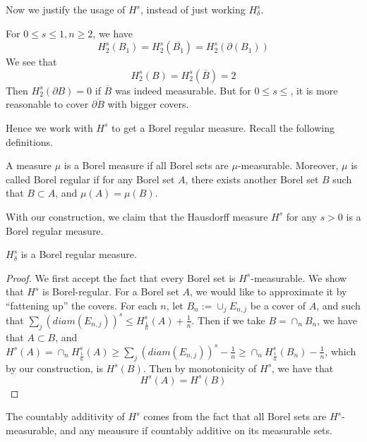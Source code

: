 Now we justify the usage of $H^s$, instead of just working $H_\delta^s$.
\begin{exercise}
    For $0\leq s\leq 1, n\geq 2$, we have
    \begin{equation*}
        H_2^s(B_1)=H_2^s(\overline{B_1})=H_2^s(\partial(B_1))
    \end{equation*}
    We see that
    \begin{equation*}
        H_2^s(B)=H_2^s(\overline{B})=2
    \end{equation*}
    Then $H_2^s(\partial B)=0$ if $\overline{B}$ was indeed measurable. But for $0\leq s\leq $, it is more reasonable to cover $\overline{\partial B}$ with bigger covers.
\end{exercise}

Hence we work with $H^s$ to get a Borel regular measure. Recall the following definitions.
\begin{definition}
    A measure $\mu$ is a Borel measure if all Borel sets are $\mu$-measurable. Moreover, $\mu$ is called Borel regular if for any Borel set $A$, there exists another Borel set $B$ such that $B\subset A$, and $\mu(A)=\mu(B)$.
\end{definition}
With our construction, we claim that the Hausdorff measure $H^s$ for any $s>0$ is a Borel regular measure.
\begin{proposition}
    $H_\delta^s$ is a Borel regular measure.
\end{proposition}
\begin{proof}
    We first accept the fact that every Borel set is $H^s$-measurable. We show that $H^s$ is Borel-regular. For a Borel set $A$, we would like to approximate it by ``fattening up'' the covers. For each $n$, let $B_n:=\cup_jE_{n,j}$ be a cover of $A$, and such that $\sum_{j}(diam(E_{n,j}))^s\leq H_\frac{1}{n}^s(A)+\frac{1}{n}$. Then if we take $B=\cap_nB_n$, we have that $A\subset B$, and $H^s(A)=\cap_n H_\frac{1}{n}^s(A)\geq\sum_j(diam(E_{n,j}))^s-\frac{1}{n}\geq \cap_nH_\frac{1}{n}^s(B_n)-\frac{1}{n}$, which by our construction, is $H^s(B)$. Then by monotonicity of $H^s$, we have that
    \begin{equation*}
        H^s(A)=H^s(B)
    \end{equation*}
\end{proof}
\begin{note}
    The countably additivity of $H^s$ comes from the fact that all Borel sets are $H^s$-measurable, and any meausure if countably additive on its measurable sets.
\end{note}


